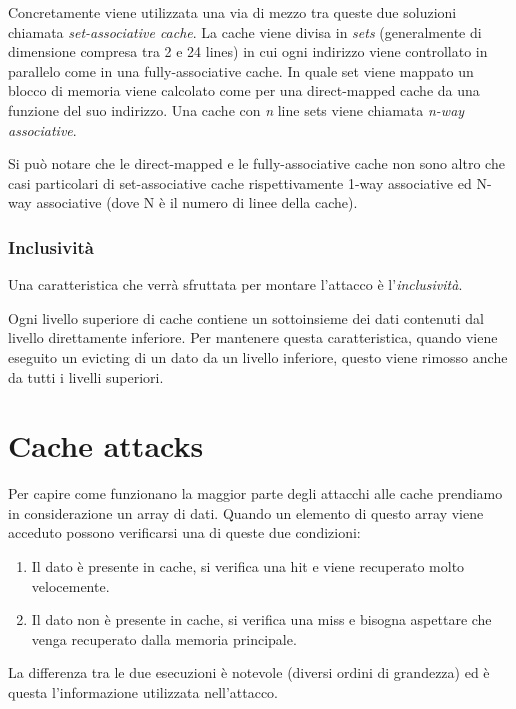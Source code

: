 				Concretamente viene utilizzata una via di mezzo tra queste due soluzioni chiamata \emph{set-associative cache}. La cache viene divisa in \emph{sets} (generalmente di dimensione compresa tra 2 e 24 lines) in cui ogni indirizzo viene controllato in parallelo come in una fully-associative cache. In quale set viene mappato un blocco di memoria viene calcolato come per una direct-mapped cache da una funzione del suo indirizzo. Una cache con \emph{n} line sets viene chiamata \emph{n-way associative}.
				
				Si può notare che le direct-mapped e le fully-associative cache non sono altro che casi particolari di set-associative cache rispettivamente 1-way associative ed N-way associative (dove N è il numero di linee della cache).
				
			\subsubsection{Inclusività}
				Una caratteristica che verrà sfruttata per montare l'attacco è l'\emph{inclusività}. 
				
				Ogni livello superiore di cache contiene un sottoinsieme dei dati contenuti dal livello direttamente inferiore. Per mantenere questa caratteristica, quando viene eseguito un evicting di un dato da un livello inferiore, questo viene rimosso anche da tutti i livelli superiori.
				
	\section{Cache attacks}
		Per capire come funzionano la maggior parte degli attacchi alle cache prendiamo in considerazione un array di dati. Quando un elemento di questo array viene acceduto possono verificarsi una di queste due condizioni:
		
		\begin{enumerate}
			\item Il dato è presente in cache, si verifica una hit e viene recuperato molto velocemente.
			\item Il dato non è presente in cache, si verifica una miss e bisogna aspettare che venga recuperato dalla memoria principale.
		\end{enumerate}
		
		La differenza tra le due esecuzioni è notevole (diversi ordini di grandezza) ed è questa l'informazione utilizzata nell'attacco.
		
